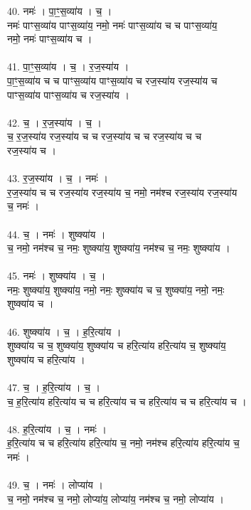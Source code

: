 40. नमः॑ । पा॒ꣳ॒स॒व्या॑य । च॒ ।\\
नमः॑ पाꣳस॒व्या॑य पाꣳस॒व्या॑य॒ नमो॒ नमः॑ पाꣳस॒व्या॑य च च पाꣳस॒व्या॑य॒\\
नमो॒ नमः॑ पाꣳस॒व्या॑य च ।\\
\\
41. पा॒ꣳ॒स॒व्या॑य । च॒ । र॒ज॒स्या॑य ।\\
पा॒ꣳ॒स॒व्या॑य च च पाꣳस॒व्या॑य पाꣳस॒व्या॑य च रज॒स्या॑य रज॒स्या॑य च\\
पाꣳस॒व्या॑य पाꣳस॒व्या॑य च रज॒स्या॑य ।\\
\\
42. च॒ । र॒ज॒स्या॑य । च॒ ।\\
च॒ र॒ज॒स्या॑य रज॒स्या॑य च च रज॒स्या॑य च च रज॒स्या॑य च च\\
रज॒स्या॑य च ।\\
\\
43. र॒ज॒स्या॑य । च॒ । नमः॑ ।\\
र॒ज॒स्या॑य च च रज॒स्या॑य रज॒स्या॑य च॒ नमो॒ नम॑श्च रज॒स्या॑य रज॒स्या॑य\\
च॒ नमः॑ ।\\
\\
44. च॒ । नमः॑ । शुष्क्या॑य ।\\
च॒ नमो॒ नम॑श्च च॒ नमः॒ शुष्क्या॑य॒ शुष्क्या॑य॒ नम॑श्च च॒ नमः॒ शुष्क्या॑य ।\\
\\
45. नमः॑ । शुष्क्या॑य । च॒ ।\\
नमः॒ शुष्क्या॑य॒ शुष्क्या॑य॒ नमो॒ नमः॒ शुष्क्या॑य च च॒ शुष्क्या॑य॒ नमो॒ नमः॒\\
शुष्क्या॑य च ।\\
\\
46. शुष्क्या॑य । च॒ । ह॒रि॒त्या॑य ।\\
शुष्क्या॑य च च॒ शुष्क्या॑य॒ शुष्क्या॑य च हरि॒त्या॑य हरि॒त्या॑य च॒ शुष्क्या॑य॒\\
शुष्क्या॑य च हरि॒त्या॑य ।\\
\\
47. च॒ । ह॒रि॒त्या॑य । च॒ ।\\
च॒ ह॒रि॒त्या॑य हरि॒त्या॑य च च हरि॒त्या॑य च च हरि॒त्या॑य च च हरि॒त्या॑य च ।\\
\\
48. ह॒रि॒त्या॑य । च॒ । नमः॑ ।\\
ह॒रि॒त्या॑य च च हरि॒त्या॑य हरि॒त्या॑य च॒ नमो॒ नम॑श्च हरि॒त्या॑य हरि॒त्या॑य च॒\\
नमः॑ ।\\
\\
49. च॒ । नमः॑ । लोप्या॑य ।\\
च॒ नमो॒ नम॑श्च च॒ नमो॒ लोप्या॑य॒ लोप्या॑य॒ नम॑श्च च॒ नमो॒ लोप्या॑य ।\\
